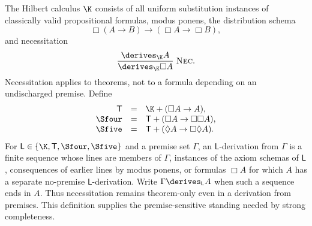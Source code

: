 The Hilbert calculus \(\K\) consists of all uniform substitution
instances of classically valid propositional formulas, modus ponens, the
distribution schema
\[
  \Box(A\to B)\to(\Box A\to\Box B),
  \tag{K}
\]
and necessitation
\[
  \frac{\derives_{\K}A}{\derives_{\K}\Box A}\;\textsc{Nec}.
\]
Necessitation applies to theorems, not to a formula depending on an
undischarged premise.  Define
\[
\begin{array}{rcl}
  \mathsf T&=&\K+(\Box A\to A),\\
  \Sfour&=&\mathsf T+(\Box A\to\Box\Box A),\\
  \Sfive&=&\mathsf T+(\Diamond A\to\Box\Diamond A).
\end{array}
\]
For \(\mathsf L\in\{\K,\mathsf T,\Sfour,\Sfive\}\) and a premise set
\(\Gamma\), an \(\mathsf L\)-derivation from \(\Gamma\) is a finite sequence
whose lines are members of \(\Gamma\), instances of the axiom schemas of
\(\mathsf L\), consequences of earlier lines by modus ponens, or formulas
\(\Box A\) for which \(A\) has a separate no-premise
\(\mathsf L\)-derivation.  Write \(\Gamma\derives_{\mathsf L}A\) when such a
sequence ends in \(A\).  Thus necessitation remains theorem-only even in a
derivation from premises.  This definition supplies the premise-sensitive
standing needed by strong completeness.

